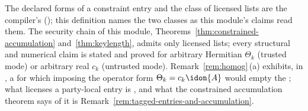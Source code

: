 
The declared forms of a constraint entry and the class of licensed lists are
the compiler's (); this definition names the
two classes as this module's claims read them. The security chain of this
module, Theorems~\ref{thm:constrained-accumulation} and~\ref{thm:keylength},
admits only licensed lists; every structural and numerical claim is stated
and proved for arbitrary Hermitian $\Theta_k$ (trusted mode) or arbitrary real
$c_k$ (untrusted mode). Remark~\ref{rem:homog}\,(a) exhibits, in
, a  for which imposing the operator form
$\Theta_k=c_k\idon{A}$ would empty the ; what licenses a
party-local entry is , and
what the constrained accumulation theorem says of it is
Remark~\ref{rem:tagged-entries-and-accumulation}.

